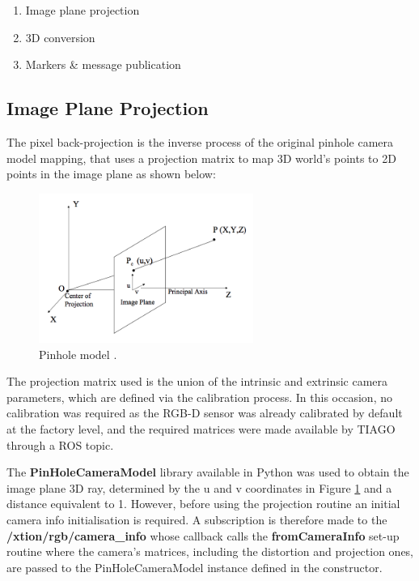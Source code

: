 \begin{enumerate}
  \item Image plane projection
  \item 3D conversion
  \item Markers \& message publication
\end{enumerate}

\subsection{Image Plane Projection}

The pixel back-projection is the inverse process of the original pinhole camera model mapping, that uses a projection matrix to map 3D world's points to 2D points in the image plane as shown below:

\begin{figure}[!htbp]
  \begin{center}
    \includegraphics[width=7cm]{images/chapter4_pinhole_model.png}
  \end{center}
  \caption{Pinhole model \cite{website:majumder}.}
  \label{fig:pinhole}
\end{figure}

The projection matrix used is the union of the intrinsic and extrinsic camera parameters, which are defined via the calibration process. In this occasion, no calibration was required as the RGB-D sensor was already calibrated by default at the factory level, and the required matrices were made available by TIAGO through a ROS topic.

The \textbf{PinHoleCameraModel} library available in Python was used to obtain the image plane 3D ray, determined by the u and v coordinates in Figure \ref{fig:pinhole} and a distance equivalent to 1. However, before using the projection routine an initial camera info initialisation is required. A subscription is therefore made to the \textbf{/xtion/rgb/camera\_info} whose callback calls the \textbf{fromCameraInfo} set-up routine where the camera's matrices, including the distortion and projection ones, are passed to the PinHoleCameraModel instance defined in the constructor.

